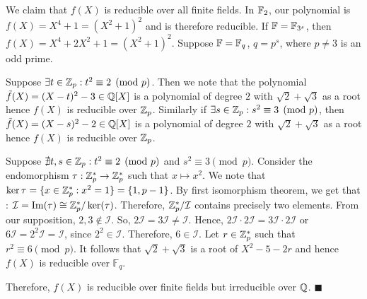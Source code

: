 We claim that $f(X)$ is reducible over all finite fields. In $\mathbb{F}_2$, our polynomial is $f(X) = X^4 + 1 = (X^2+1)^2$ and is therefore reducible. If $\mathbb{F} = \mathbb{F}_{3^s}$, then $f(X) = X^4+2X^2+1 = (X^2+1)^2$. Suppose $\mathbb{F} = \mathbb{F}_{q}$, $q=p^s$, where $p\neq 3$ is an odd prime.

Suppose $\exists t\in \mathbb{Z}_p : t^2 \equiv 2 \pmod{p}$. Then we note that the polynomial $\tilde{f}(X) = (X-t)^2 - 3 \in \mathbb{Q}[X]$ is a polynomial of degree $2$ with $\sqrt{2}+\sqrt{3}$ as a root hence $f(X)$ is reducible over $\mathbb{Z}_p$. Similarly if $\exists s\in \mathbb{Z}_p : s^2 \equiv 3 \pmod{p}$, then $\tilde{f}(X) = (X-s)^2-2 \in \mathbb{Q}[X]$ is a polynomial of degree $2$ with $\sqrt{2}+\sqrt{3}$ as a root hence $f(X)$ is reducible over $\mathbb{Z}_p$.

Suppose $\nexists t,s \in \mathbb{Z}_p : t^2\equiv 2 \pmod{p}$ and $s^2 \equiv 3 \pmod{p}$. Consider the endomorphism $\tau : \mathbb{Z}_p^* \to \mathbb{Z}_p^*$ such that $x\mapsto x^2$. We note that $\ker{\tau} = \{x\in \mathbb{Z}_p^* : x^2 = 1\} = \{1,p-1\}$. By first isomorphism theorem, we get that : $\mathcal{I} = \operatorname{Im}(\tau)\cong \mathbb{Z}_p^*/\ker(\tau)$. Therefore, $\mathbb{Z}_p^*/\mathcal{I}$ contains precisely two elements. From our supposition, $2,3\notin \mathcal{I}$. So, $2\mathcal{I}=3\mathcal{I}\neq \mathcal{I}$. Hence, $2\mathcal{I}\cdot 2\mathcal{I}=3\mathcal{I}\cdot 2\mathcal{I}$ or $6\mathcal{I} = 2^2\mathcal{I} = \mathcal{I}$, since $2^2\in \mathcal{I}$. Therefore, $6\in \mathcal{I}$. Let $r\in \mathbb{Z}_p^*$ such that $r^2 \equiv 6 \pmod{p}$. It follows that $\sqrt{2}+\sqrt{3}$ is a root of $X^2 - 5 -2r$ and hence $f(X)$ is reducible over $\mathbb{F}_q$.

Therefore, $f(X)$ is reducible over finite fields but irreducible over $\mathbb{Q}$. \hfill $\blacksquare$







